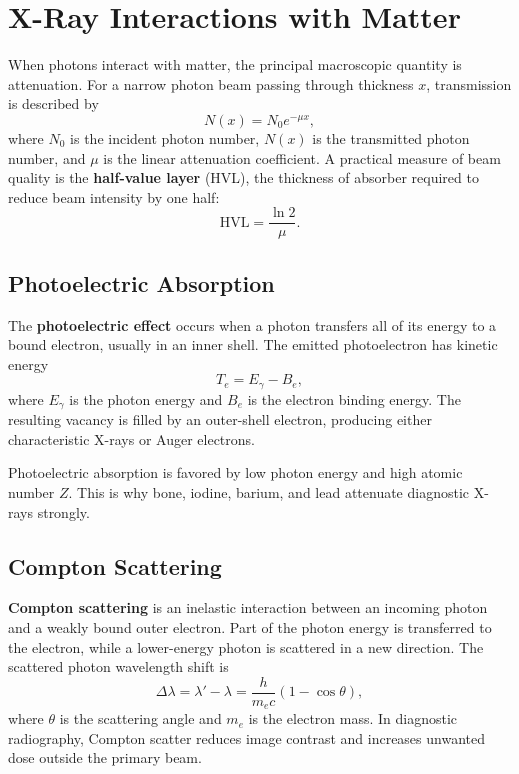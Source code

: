 \documentclass[12pt]{article}
\begin{document}
\section{X-Ray Interactions with Matter}

When photons interact with matter, the principal macroscopic quantity is attenuation. For a narrow photon beam passing through thickness $x$, transmission is described by
\begin{equation}
    N(x) = N_0 e^{-\mu x},
\end{equation}
where $N_0$ is the incident photon number, $N(x)$ is the transmitted photon number, and $\mu$ is the linear attenuation coefficient. A practical measure of beam quality is the \textbf{half-value layer} (HVL), the thickness of absorber required to reduce beam intensity by one half:
\begin{equation}
    \mathrm{HVL} = \frac{\ln 2}{\mu}.
\end{equation}

\subsection{Photoelectric Absorption}

The \textbf{photoelectric effect} occurs when a photon transfers all of its energy to a bound electron, usually in an inner shell. The emitted photoelectron has kinetic energy
\begin{equation}
    T_e = E_{\gamma} - B_e,
\end{equation}
where $E_{\gamma}$ is the photon energy and $B_e$ is the electron binding energy. The resulting vacancy is filled by an outer-shell electron, producing either characteristic X-rays or Auger electrons.

Photoelectric absorption is favored by low photon energy and high atomic number $Z$. This is why bone, iodine, barium, and lead attenuate diagnostic X-rays strongly.

\subsection{Compton Scattering}

\textbf{Compton scattering} is an inelastic interaction between an incoming photon and a weakly bound outer electron. Part of the photon energy is transferred to the electron, while a lower-energy photon is scattered in a new direction. The scattered photon wavelength shift is
\begin{equation}
    \Delta \lambda = \lambda' - \lambda
    = \frac{h}{m_e c}(1-\cos\theta),
\end{equation}
where $\theta$ is the scattering angle and $m_e$ is the electron mass. In diagnostic radiography, Compton scatter reduces image contrast and increases unwanted dose outside the primary beam.
\end{document}
